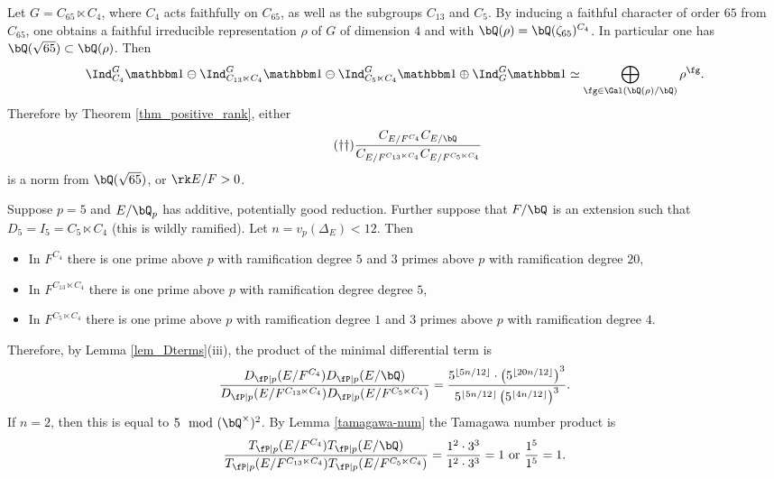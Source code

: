 \begin{example}
Let $G = C_{65} \ltimes C_4$, where $C_4$ acts faithfully on $C_{65}$, as well as the subgroups $C_{13}$ and $C_5$. By inducing a faithful character of order $65$ from $C_{65}$, one obtains a faithful irreducible representation $\rho$ of $G$ of dimension $4$ and with $\bQ(\rho) = \bQ(\zeta_{65})^{C_4}$. In particular one has $\bQ(\sqrt{65}) \subset \bQ(\rho)$. Then
\[ \Ind_{C_4}^G \trivial \ominus \Ind_{C_{13} \ltimes C_4}^G \trivial \ominus \Ind_{C_5 \ltimes C_4}^G \trivial \oplus \Ind_{G}^G \trivial \simeq \bigoplus_{\fg \in \Gal(\bQ(\rho) / \bQ)} \rho^{\fg} .\]
Therefore by Theorem \ref{thm_positive_rank}, either 
\begin{equation}\label{ex3}\tag{\textdagger \textdagger}
\frac{C_{E / F^{C_4}} C_{E / \bQ} }{C_{E / F^{C_{13} \ltimes C_4}} C_{E / F^{C_5 \ltimes C_4}}}
\end{equation}
is a norm from $\bQ(\sqrt{65})$, or $\rk E / F > 0$.  

Suppose $p = 5$ and $E / \bQ_p$ has additive, potentially good reduction. Further suppose that $F / \bQ$ is an extension such that $D_{5} = I_{5} = C_5 \ltimes C_4$ (this is wildly ramified). Let $n = v_p(\Delta_E) < 12$. Then
\begin{itemize}[--]
    \setlength\itemsep{0em}
    \item In $F^{C_4}$ there is one prime above $p$ with ramification degree $5$ and $3$ primes above $p$ with ramification degree $20$,
    \item In $F^{C_{13} \ltimes C_4}$ there is one prime above $p$ with ramification degree degree $5$,
    \item In $F^{C_5 \ltimes C_4}$ there is one prime above $p$ with ramification degree $1$ and $3$ primes above $p$ with ramification degree $4$.
\end{itemize}
Therefore, by Lemma \ref{lem_Dterms}(iii), the product of the minimal differential term is 
\[ \frac{D_{\fP \mid p}(E / F^{C_4}) D_{\fP \mid p}(E / \bQ) }{D_{\fP \mid p}(E / F^{C_{13} \ltimes C_4}) D_{\fP \mid p}(E / F^{C_{5} \ltimes C_4})} = 
\frac{ 5^{\floor{5 n /12}} \cdot \left(5^{\floor{20 n /12}}\right)^3 }{5^{\floor{5 n /12}} \left(5^{\floor{4 n /12}}\right)^3} .\]
If $n = 2$, then this is equal to $5 \mod {(\bQ^{\times})^2}$. By Lemma \ref{tamagawa-num} the Tamagawa number product is
\[ \frac{T_{\fP \mid p}(E / F^{C_4}) T_{\fP \mid p}(E / \bQ) }{T_{\fP \mid p}(E / F^{C_{13} \ltimes C_4}) T_{\fP \mid p}(E / F^{C_{5} \ltimes C_4})} = \frac{1^2 \cdot 3^3 }{1^2 \cdot 3^3} = 1 \text{ or } \frac{1^5}{1^5} = 1.\]


\end{example}
